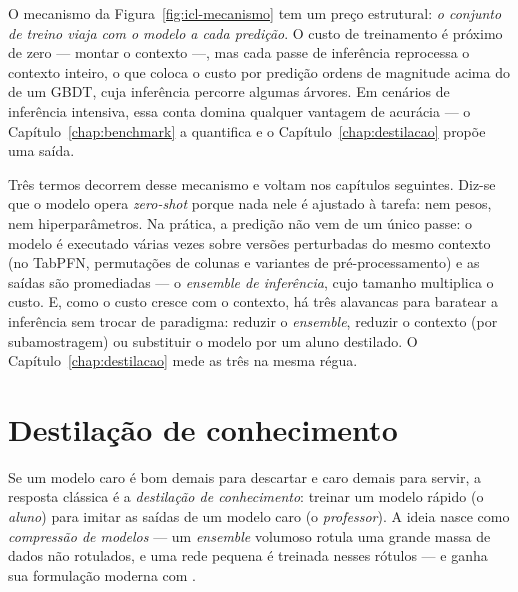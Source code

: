 O mecanismo da
Figura~\ref{fig:icl-mecanismo} tem um preço estrutural: \emph{o conjunto de
treino viaja com o modelo a cada predição}. O custo de treinamento é
próximo de zero --- montar o contexto ---, mas cada passe de inferência
reprocessa o contexto inteiro, o que coloca o custo por predição ordens de
magnitude acima do de um GBDT, cuja inferência percorre algumas árvores. Em
cenários de inferência intensiva, essa conta domina qualquer vantagem de
acurácia --- o Capítulo~\ref{chap:benchmark} a quantifica e o Capítulo~\ref{chap:destilacao} propõe uma saída.

Três termos decorrem desse mecanismo e voltam nos capítulos
seguintes. Diz-se que o modelo opera \emph{zero-shot} porque nada
nele é ajustado à tarefa: nem pesos, nem hiperparâmetros. Na prática,
a predição não vem de um único passe: o modelo é executado várias
vezes sobre versões perturbadas do mesmo contexto (no TabPFN,
permutações de colunas e variantes de pré-processamento) e as saídas
são promediadas --- o \emph{ensemble de inferência}, cujo tamanho
multiplica o custo. E, como o custo cresce com o contexto, há três
alavancas para baratear a inferência sem trocar de paradigma: reduzir
o \emph{ensemble}, reduzir o contexto (por subamostragem) ou
substituir o modelo por um aluno destilado. O
Capítulo~\ref{chap:destilacao} mede as três na mesma régua.

\section{Destilação de conhecimento}
\label{sec:fund-destilacao}

Se um modelo caro é bom demais para descartar e caro demais para servir, a
resposta clássica é a \emph{destilação de conhecimento}: treinar um modelo
rápido (o \emph{aluno}) para imitar as saídas de um modelo caro (o
\emph{professor}). A ideia nasce como \emph{compressão de modelos}
\citep{bucila2006} --- um \emph{ensemble} volumoso rotula uma grande massa
de dados não rotulados, e uma rede pequena é treinada nesses rótulos ---
e ganha sua formulação moderna com \citet{hinton2015}.

